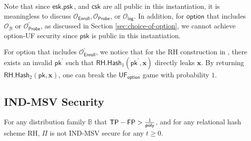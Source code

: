Note that since $\textsf{esk}, \textsf{psk}$, and $ \textsf{csk}$ are all public in this instantiation, it is meaningless to discuss $\mathcal{O}_\textsf{Enroll}, \mathcal{O}_\textsf{Probe}$, or $\mathcal{O}_\textsf{log}$. In addition, for $\textsf{option}$ that includes $\mathcal{O}_\mathcal{B}$ or $\mathcal{O}_\textsf{Probe}^\prime$, as discussed in Section \ref{sec:choice-of-option}, we cannot achieve \textsf{option}-UF security since $\textsf{psk}$ is public in this instantiation.

For \textsf{option} that includes $\mathcal{O}_\textsf{Enroll}^\prime$, we notice that for the \textsf{RH} construction in \cite{cryptoeprint:2014/394}, there exists an invalid $\textsf{pk}^\prime$ such that $\textsf{RH.Hash}_1(\textsf{pk}^\prime, \mathbf{x})$ directly leaks $\mathbf{x}$. By returning $\textsf{RH.Hash}_2( \textsf{pk}, \mathbf{x} )$, one can break the $\textsf{UF}_{\textsf{option}}$ game with probability $1$.



\subsection{IND-MSV Security}
\label{sec:security_analysis:rh:IND-MSV}

\begin{theorem}

For any distribution family $\mathbb{B}$ that $\textsf{TP} - \textsf{FP} > \frac{1}{\mathsf{poly}}$, and for any relational hash scheme \textsf{RH}, $\Pi$ is not IND-MSV secure for any $t \geq 0$.

\end{theorem}

